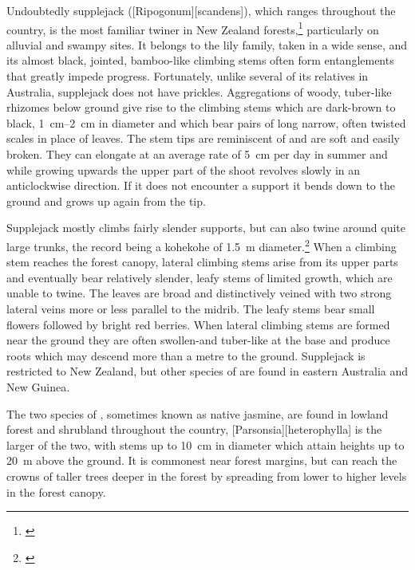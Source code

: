 Undoubtedly supplejack ([Ripogonum][scandens]), which ranges throughout the country, is the most familiar twiner in New Zealand forests,\footnote{\cite{macmillan1973biological}} particularly on alluvial and swampy sites.
It belongs to the lily family, taken in a wide sense, and its almost black, jointed, bamboo-like climbing stems often form entanglements that greatly impede progress.
Fortunately, unlike several of its relatives in Australia, supplejack does not have prickles.
Aggregations of woody, tuber-like rhizomes below ground give rise to the climbing stems which are dark-brown to black, \SIrange{1}{2}{\centi\metre} in diameter and which bear pairs of long narrow, often twisted scales in place of leaves.
The stem tips are reminiscent of  and are soft and easily broken.
They can elongate at an average rate of \SI{5}{\centi\metre} per day in summer and while growing upwards the upper part of the shoot revolves slowly in an anticlockwise direction.
If it does not encounter a support it bends down to the ground and grows up again from the tip.

Supplejack mostly climbs fairly slender supports, but can also twine around quite large trunks, the record being a kohekohe of \SI{1.5}{\metre} diameter.\footnote{\cite{macmillan1973biological}}
When a climbing stem reaches the forest canopy, lateral climbing stems arise from its upper parts and eventually bear relatively slender, leafy stems of limited growth, which are unable to twine.
The leaves are broad and distinctively veined with two strong lateral veins more or less parallel to the midrib.
The leafy stems bear small flowers followed by bright red berries.
When lateral climbing stems are formed near the ground they are often swollen-and tuber-like at the base and produce roots which may descend more than a metre to the ground.
Supplejack is restricted to New Zealand, but other species of  are found in eastern Australia and New Guinea.

The two species of , sometimes known as native jasmine, are found in lowland forest and shrubland throughout the country, [Parsonsia][heterophylla] is the larger of the two, with stems up to \SI{10}{\centi\metre} in diameter which attain heights up to \SI{20}{\metre} above the ground.
It is commonest near forest margins, but can reach the crowns of taller trees deeper in the forest by spreading from lower to higher levels in the forest canopy.

